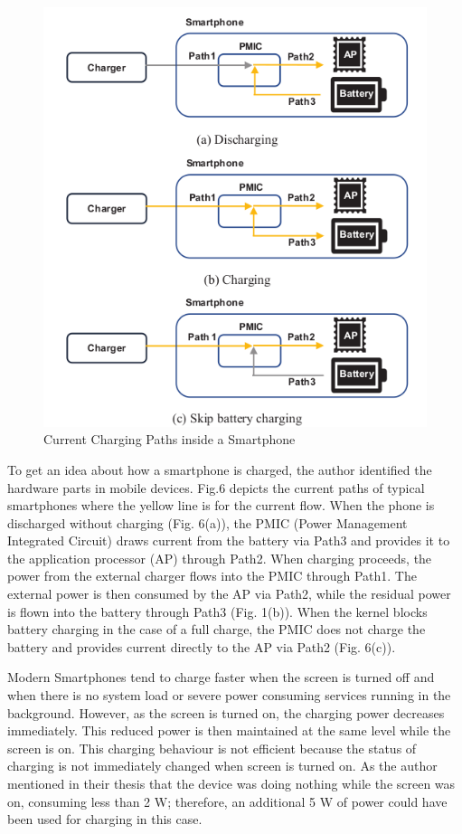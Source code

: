 \documentclass[conference]{IEEEtran}
\begin{document}
\begin{figure}[h!]
  \includegraphics[width=\linewidth]{images/image6.png}
  \caption{Current Charging Paths inside a Smartphone\cite{b1}}
\end{figure}

To get an idea about how a smartphone is charged, the author\cite{b1} identified the hardware parts in mobile devices. Fig.6 depicts the current paths of typical smartphones where the yellow line is for the current flow. When the phone is discharged without charging (Fig. 6(a)), the PMIC (Power Management Integrated Circuit) draws current from the battery via Path3 and provides it to the application processor (AP) through Path2. When charging proceeds, the power from the external charger flows into the PMIC through Path1. The external power is then consumed by the AP via Path2, while the residual power is flown into the battery through Path3 (Fig. 1(b)). When the kernel blocks battery charging in the case of a full charge, the PMIC does not charge the battery and provides current directly to the AP via Path2 (Fig. 6(c)). \cite{b1}

Modern Smartphones tend to charge faster when the screen is turned off and when there is no system load or severe power consuming services running in the background. However, as the screen is turned on, the charging power decreases immediately. This reduced power is then maintained at the same level while the screen is on. This charging behaviour is not efficient because the status of charging is not immediately changed when screen is turned on. As the author \cite{b1} mentioned in their thesis that the device was doing nothing while the screen was on, consuming less than 2 W; therefore, an additional 5 W of power could have been used for charging in this case.\cite{b1}
\end{document}
